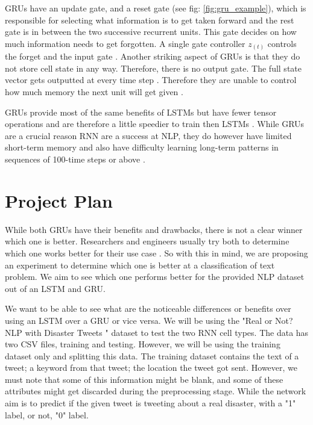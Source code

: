 \documentclass[a4paper,10pt]{article}
\begin{document}
	GRUs have an update gate, and a reset gate (see fig: \ref{fig:gru_example}), which is responsible for selecting what information is to get taken forward and the rest gate is in between the two successive recurrent units. This gate decides on how much information needs to get forgotten. A single gate controller $z_{(t)}$ controls the forget and the input gate \cite{geron2019hands}.  Another striking aspect of GRUs is that they do not store cell state in any way. Therefore, there is no output gate. The full state vector gets outputted at every time step \cite{geron2019hands}. Therefore they are unable to control how much memory the next unit will get given \cite{g4g}.    
	
	GRUs provide most of the same benefits of LSTMs but have fewer tensor operations and are therefore a little speedier to train then LSTMs \cite{illustrated_lstm_gru}. While GRUs are a crucial reason RNN are a success at NLP, they do however have limited short-term memory and also have difficulty learning long-term patterns in sequences of 100-time steps or above \cite{geron2019hands}.


\section{Project Plan}
\label{sec:project_plan}

	While both GRUs have their benefits and drawbacks, there is not a clear winner which one is better. Researchers and engineers usually try both to determine which one works better for their use case \cite{illustrated_lstm_gru}. So with this in mind, we are proposing an experiment to determine which one is better at a classification of text problem. We aim to see which one performs better for the provided NLP dataset out of an LSTM and GRU.
	
	We want to be able to see what are the noticeable differences or benefits over using an LSTM over a GRU or vice versa. We will be using the "Real or Not? NLP with Disaster Tweets \cite{disater_kaggle}" dataset to test the two RNN cell types.  The data has two CSV files, training and testing. However, we will be using the training dataset only and splitting this data.
	The training dataset contains the text of a tweet; a keyword from that tweet; the location the tweet got sent. However, we must note that some of this information might be blank, and some of these attributes might get discarded during the preprocessing stage. While the network aim is to predict if the given tweet is tweeting about a real disaster, with a "1" label, or not, "0" label. 
	
\end{document}
